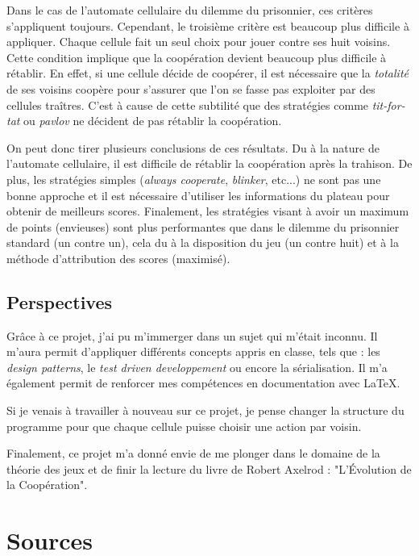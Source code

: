 \documentclass[a4paper, french]{article}
\begin{document}
Dans le cas de l'automate cellulaire du dilemme du prisonnier, ces critères s'appliquent toujours. Cependant, le troisième critère est beaucoup plus difficile à appliquer. Chaque cellule fait un seul choix pour jouer contre ses huit voisins. Cette condition implique que la coopération devient beaucoup plus difficile à rétablir. En effet, si une cellule décide de coopérer, il est nécessaire que la \textit{totalité} de ses voisins coopère pour s'assurer que l'on se fasse pas exploiter par des cellules traîtres. C'est à cause de cette subtilité que des stratégies comme \textit{tit-for-tat} ou \textit{pavlov} ne décident de pas rétablir la coopération.

On peut donc tirer plusieurs conclusions de ces résultats. Du à la nature de l'automate cellulaire, il est difficile de rétablir la coopération après la trahison. De plus, les stratégies simples (\textit{always cooperate}, \textit{blinker}, etc...) ne sont pas une bonne approche et il est nécessaire d'utiliser les informations du plateau pour obtenir de meilleurs scores. Finalement, les stratégies visant à avoir un maximum de points (envieuses) sont plus performantes que dans le dilemme du prisonnier standard (un contre un), cela du à la disposition du jeu (un contre huit) et à la méthode d'attribution des scores (maximisé).

\subsection{Perspectives}
Grâce à ce projet, j'ai pu m'immerger dans un sujet qui m'était inconnu. Il m'aura permit d'appliquer différents concepts appris en classe, tels que : les \textit{design patterns}, le \textit{test driven developpement} ou encore la sérialisation. Il m'a également permit de renforcer mes compétences en documentation avec \LaTeX{}.

Si je venais à travailler à nouveau sur ce projet, je pense changer la structure du programme pour que chaque cellule puisse choisir une action par voisin. 

Finalement, ce projet m'a donné envie de me plonger dans le domaine de la théorie des jeux et de finir la lecture du livre de Robert Axelrod : "L'Évolution de la Coopération".

\pagebreak
\section{Sources}
\printbibliography{}
\end{document}

